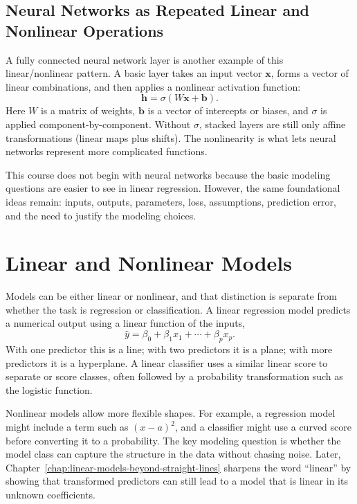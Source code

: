 {\subsection{Neural Networks as Repeated Linear and Nonlinear Operations}

A fully connected neural network layer is another example of this linear/nonlinear pattern.  A basic layer takes an input vector $\mathbf{x}$, forms a vector of linear combinations, and then applies a nonlinear activation function:
\begin{equation}
  \mathbf{h} = \sigma(W\mathbf{x}+\mathbf{b}).
  \label{eq:nn-layer-first}
\end{equation}
Here $W$ is a matrix of weights, $\mathbf{b}$ is a vector of intercepts or biases, and $\sigma$ is applied component-by-component.  Without $\sigma$, stacked layers are still only affine transformations (linear maps plus shifts).  The nonlinearity is what lets neural networks represent more complicated functions.

This course does not begin with neural networks because the basic modeling questions are easier to see in linear regression.  However, the same foundational ideas remain: inputs, outputs, parameters, loss, assumptions, prediction error, and the need to justify the modeling choices.
}{
\section{Linear and Nonlinear Models}

Models can be either linear or nonlinear, and that distinction is separate from whether the task is regression or classification.  A linear regression model predicts a numerical output using a linear function of the inputs,
\[
  \widehat{y}=\beta_0+\beta_1x_1+\cdots+\beta_px_p.
\]
With one predictor this is a line; with two predictors it is a plane; with more predictors it is a hyperplane.  A linear classifier uses a similar linear score to separate or score classes, often followed by a probability transformation such as the logistic function.

Nonlinear models allow more flexible shapes.  For example, a regression model might include a term such as $(x-a)^2$, and a classifier might use a curved score before converting it to a probability.  The key modeling question is whether the model class can capture the structure in the data without chasing noise.  Later, Chapter~\ref{chap:linear-models-beyond-straight-lines} sharpens the word ``linear'' by showing that transformed predictors can still lead to a model that is linear in its unknown coefficients.

}
